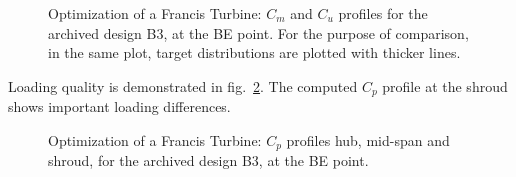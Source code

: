 \begin{figure}[h!]
\begin{minipage}[b]{1\linewidth}
 \centering
\end{minipage}
\caption{Optimization of a Francis Turbine: $C_m$ and $C_u$ profiles for the archived design B3, at the BE point. For the purpose of comparison, in the same plot, target distributions are plotted with thicker lines.}
\label{Francis-B3-OUT}
\end{figure}

Loading quality is demonstrated in fig.\ \ref{Francis-B3-LOAD}. The computed $C_p$ profile at the shroud shows important loading differences. 

\begin{figure}[h!]
\begin{minipage}[b]{1\linewidth}
 \centering
\end{minipage}
\caption{Optimization of a Francis Turbine: $C_p$ profiles hub, mid-span and shroud, for the archived design B3, at the BE point.}
\label{Francis-B3-LOAD}
\end{figure}

